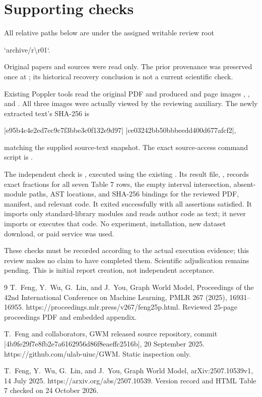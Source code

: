 \documentclass[10pt]{article}
\begin{document}
\section*{Supporting checks}
All relative paths below are under the assigned writable review root\par
`archive/r\textbackslash{}r01`.\par
Original papers and sources were read only. The prior provenance was preserved once at ; its historical recovery conclusion is not a current scientific check.\par
Existing Poppler tools read the original PDF and produced and page images , , and . All three images were actually viewed by the reviewing auxiliary. The newly extracted text’s SHA-256 is\par
|e95b4c4e2ed7ec9c7f3bbe3c0f132e9d97|
|ce03242bb50bbbeedd400d677afcf2|,\par
matching the supplied source-text snapshot. The exact source-access command script is .\par
The independent check is , executed using the existing . Its result file, , records exact fractions for all seven Table 7 rows, the empty interval intersection, absent-module paths, AST locations, and SHA-256 bindings for the reviewed PDF, manifest, and relevant code. It exited successfully with all assertions satisfied. It imports only standard-library modules and reads author code as text; it never imports or executes that code. No experiment, installation, new dataset download, or paid service was used.\par
These checks must be recorded according to the actual execution evidence; this review makes no claim to have completed them. Scientific adjudication remains pending. This is initial report creation, not independent acceptance.\par
9 T. Feng, Y. Wu, G. Lin, and J. You, Graph World Model, Proceedings of the 42nd International Conference on Machine Learning, PMLR 267 (2025), 16931–16955. https://proceedings.mlr.press/v267/feng25p.html. Reviewed 25-page proceedings PDF and embedded appendix.\par
T. Feng and collaborators, GWM released source repository, commit |4b9fe29f7e8fb2e7a6162956d86f8eaeffc2516b|, 20 September 2025. https://github.com/ulab-uiuc/GWM. Static inspection only.\par
T. Feng, Y. Wu, G. Lin, and J. You, Graph World Model, arXiv:2507.10539v1, 14 July 2025. https://arxiv.org/abs/2507.10539. Version record and HTML Table 7 checked on 24 October 2026.\par
\end{document}
